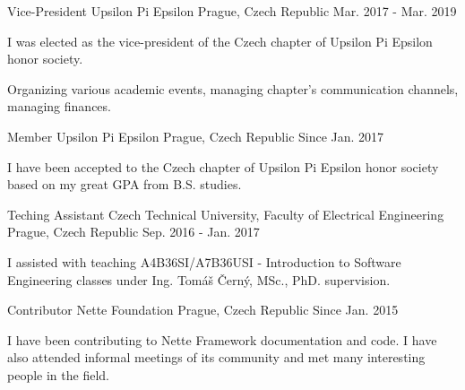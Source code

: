 \begin{cventries}
  \cventry
    {Vice-President}
    {Upsilon Pi Epsilon}
    {Prague, Czech Republic}
    {Mar. 2017 - Mar. 2019}
    {
      \begin{cvitems}
        \item {I was elected as the vice-president of the Czech chapter of Upsilon Pi Epsilon honor society.}
        \item {Organizing various academic events, managing chapter's communication channels, managing finances.}
      \end{cvitems}
    }
  \cventry
    {Member}
    {Upsilon Pi Epsilon}
    {Prague, Czech Republic}
    {Since Jan. 2017}
    {
      \begin{cvitems}
        \item {I have been accepted to the Czech chapter of Upsilon Pi Epsilon honor society based on my great GPA from B.S. studies.}
      \end{cvitems}
    }
  \cventry
    {Teching Assistant}
    {Czech Technical University, Faculty of Electrical Engineering}
    {Prague, Czech Republic}
    {Sep. 2016 - Jan. 2017}
    {
      \begin{cvitems}
        \item {I assisted with teaching A4B36SI/A7B36USI - Introduction to Software Engineering classes under Ing. Tomáš Černý, MSc., PhD. supervision.}
      \end{cvitems}
    }
  \cventry
    {Contributor}
    {Nette Foundation}
    {Prague, Czech Republic}
    {Since Jan. 2015}
    {
      \begin{cvitems}
        \item {I have been contributing to Nette Framework documentation and code. I have also attended informal meetings of its community and met many interesting people in the field.}
      \end{cvitems}
    }
\end{cventries}
